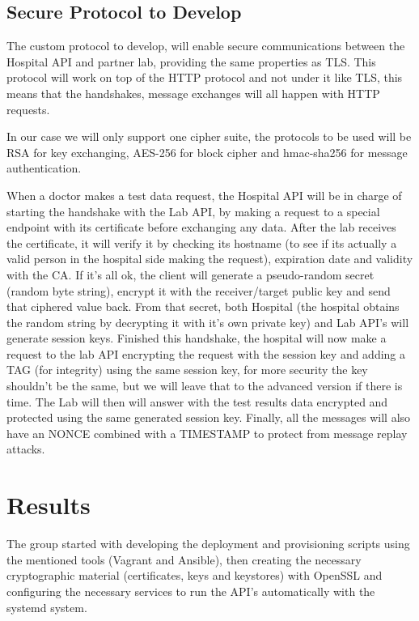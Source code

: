 \subsection{Secure Protocol to Develop}
The custom protocol to develop, will enable secure communications between the Hospital API and partner lab, providing the same properties as TLS.
This protocol will work on top of the HTTP protocol and not under it like TLS, this means that the handshakes, message exchanges will all happen with HTTP requests.

In our case we will only support one cipher suite, the protocols to be used will be RSA for key exchanging, AES-256 for block cipher and hmac-sha256 for message authentication.

When a doctor makes a test data request, the Hospital API will be in charge of starting the handshake with the Lab API, by making a request to a special endpoint with its certificate before exchanging any data.  After the lab receives the certificate, it will verify it by checking its hostname (to see if its actually a valid person in the hospital side making the request), expiration date and validity with the CA. If it's all ok, the client will generate a pseudo-random secret (random byte string), encrypt it with the receiver/target public key and send that ciphered value back. From that secret, both Hospital (the hospital obtains the random string by decrypting it with it's own private key) and Lab API's will generate session keys. Finished this handshake, the hospital will now make a request to the lab API encrypting the request with the session key and adding a TAG (for integrity) using the same session key, for more security the key shouldn't be the same, but we will leave that to the advanced version if there is time. The Lab will then will answer with the test results data encrypted and protected using the same generated session key. Finally, all the messages will also have an NONCE combined with a TIMESTAMP to protect from message replay attacks. \\


\section{Results}

The group started with developing the deployment and provisioning scripts using the mentioned tools (Vagrant and Ansible), then creating the necessary cryptographic material (certificates, keys and keystores) with OpenSSL and configuring the necessary services to run the API's automatically with the systemd system.

